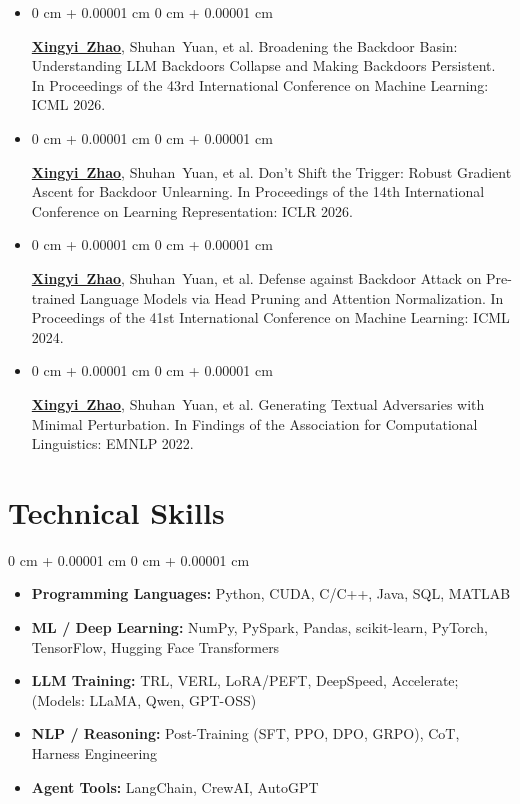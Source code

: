 \documentclass[10pt, letterpaper]{article}
\newenvironment{highlights}{
    \begin{itemize}[
        topsep=0.10 cm,
        parsep=0.10 cm,
        partopsep=0pt,
        itemsep=0pt,
        leftmargin=0 cm + 10pt
    ]
}{
    \end{itemize}
} %
\newenvironment{onecolentry}{
    \begin{adjustwidth}{
        0 cm + 0.00001 cm
    }{
        0 cm + 0.00001 cm
    }
}{
    \end{adjustwidth}
} %
\begin{document}
    \begin{highlights}

        \item\begin{onecolentry}
            \mbox{\textbf{\underline{Xingyi Zhao}}}, \mbox{Shuhan Yuan}, et al. Broadening the Backdoor Basin: Understanding LLM Backdoors Collapse and Making Backdoors Persistent. In Proceedings of the 43rd International Conference on Machine Learning: ICML 2026.
        \end{onecolentry}
        
        \item\begin{onecolentry}
            \mbox{\textbf{\underline{Xingyi Zhao}}}, \mbox{Shuhan Yuan}, et al. Don't Shift the Trigger: Robust Gradient Ascent for Backdoor Unlearning. In Proceedings of the 14th International Conference on Learning Representation: ICLR 2026.
        \end{onecolentry}

        \item\begin{onecolentry}
            \mbox{\textbf{\underline{Xingyi Zhao}}}, \mbox{Shuhan Yuan}, et al. Defense against Backdoor Attack on Pre-trained Language Models via Head Pruning and Attention Normalization. In Proceedings of the 41st International Conference on Machine Learning: ICML 2024. 
            \end{onecolentry}
    
        \item\begin{onecolentry}
            \mbox{\textbf{\underline{Xingyi Zhao}}}, \mbox{Shuhan Yuan}, et al. Generating Textual Adversaries with Minimal Perturbation. In Findings of the Association for Computational Linguistics: EMNLP 2022.
            \end{onecolentry}

    \end{highlights}

    \section{Technical Skills}
    \begin{onecolentry}
    \begin{highlights}
      \item \textbf{Programming Languages:} Python, CUDA, C/C++, Java, SQL, MATLAB
      \item \textbf{ML / Deep Learning:} NumPy, PySpark, Pandas, scikit-learn, PyTorch, TensorFlow, Hugging Face Transformers
      \item \textbf{LLM Training:} TRL, VERL, LoRA/PEFT, DeepSpeed, Accelerate; (Models: LLaMA, Qwen, GPT-OSS)
      \item \textbf{NLP / Reasoning:} Post-Training (SFT, PPO, DPO, GRPO), CoT, Harness Engineering
      \item \textbf{Agent Tools:} LangChain, CrewAI, AutoGPT
    \end{highlights}
    \end{onecolentry}

       
\end{document}
